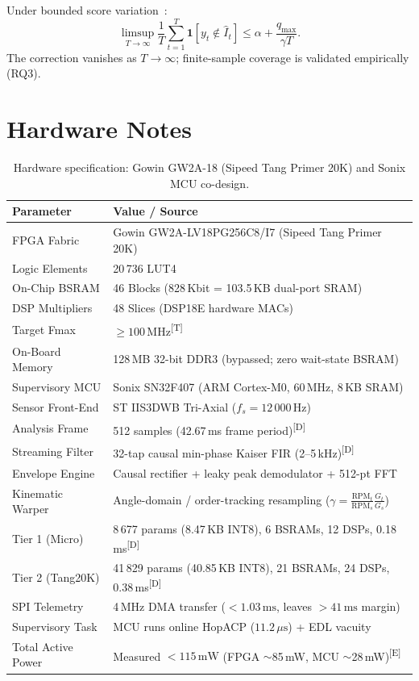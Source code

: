 \documentclass[conference]{IEEEtran}
\newcommand{\evD}{\textsuperscript{\textcolor{derived}{[D]}}\xspace}
\newcommand{\evE}{\textsuperscript{\textcolor{estimated}{[E]}}\xspace}
\newcommand{\evT}{\textsuperscript{\textcolor{target}{[T]}}\xspace}
\begin{document}
Under bounded score variation~\cite{gibbs2021adaptive}:
\begin{equation}
  \limsup_{T\to\infty}\frac{1}{T}\sum_{t=1}^T
    \mathbf{1}[y_t\notin\hat{I}_t]
    \le\alpha + \frac{q_{\max}}{\gamma T}.
\end{equation}
The correction vanishes as $T\to\infty$;
finite-sample coverage is validated empirically (RQ3).

\section{Hardware Notes}
\label{sec:hw}

\begin{table}[t]
  \centering
  \caption{Hardware specification: Gowin GW2A-18 (Sipeed Tang Primer 20K) and Sonix MCU co-design.}
  \label{tab:hw}
  \small
  \setlength{\tabcolsep}{4pt}
  \begin{tabular}{@{}L{2.5cm}L{4.8cm}@{}}
    \toprule
    \textbf{Parameter} & \textbf{Value / Source}\\
    \midrule
    FPGA Fabric & Gowin GW2A-LV18PG256C8/I7 (Sipeed Tang Primer 20K)~\cite{gowin2021gw2a}\\
    Logic Elements & 20\,736 LUT4\\
    On-Chip BSRAM & 46 Blocks (828\,Kbit = 103.5\,KB dual-port SRAM)\\
    DSP Multipliers & 48 Slices (DSP18E hardware MACs)\\
    Target Fmax & ${\ge}100\,\text{MHz}$\evT\\
    On-Board Memory & 128\,MB 32-bit DDR3 (bypassed; zero wait-state BSRAM)\\
    Supervisory MCU & Sonix SN32F407 (ARM Cortex-M0, 60\,MHz, 8\,KB SRAM)\\
    Sensor Front-End & ST IIS3DWB Tri-Axial ($f_s = 12\,000\,\text{Hz}$)~\cite{st2021iis3dwb}\\
    Analysis Frame & 512 samples (42.67\,ms frame period)\evD\\
    Streaming Filter & 32-tap causal min-phase Kaiser FIR (2--5\,kHz)\evD\\
    Envelope Engine & Causal rectifier + leaky peak demodulator + 512-pt FFT\\
    Kinematic Warper & Angle-domain / order-tracking resampling ($\gamma = \frac{\text{RPM}_t}{\text{RPM}_s}\frac{G_t}{G_s}$)\\
    Tier 1 (Micro) & 8\,677 params (8.47\,KB INT8), 6 BSRAMs, 12 DSPs, 0.18\,ms\evD\\
    Tier 2 (Tang20K) & 41\,829 params (40.85\,KB INT8), 21 BSRAMs, 24 DSPs, 0.38\,ms\evD\\
    SPI Telemetry & 4\,MHz DMA transfer ($<1.03\,\text{ms}$, leaves $>41\,\text{ms}$ margin)\\
    Supervisory Task & MCU runs online HopACP ($11.2\,\mu\text{s}$) + EDL vacuity\\
    Total Active Power & Measured $<115\,\text{mW}$ (FPGA $\sim$85\,mW, MCU $\sim$28\,mW)\evE\\
    \bottomrule
  \end{tabular}
\end{table}
\end{document}
